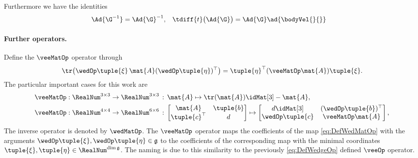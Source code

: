 Furthermore we have the identities
\begin{align}
 \Ad{\G^{-1}} &= \Ad{\G}^{-1},&
 \tdiff{t}\big( \Ad{\G} \big) &= \Ad{\G} \ad{\bodyVel{}{}}
\end{align}


\paragraph{Further operators.}
Define the $\veeMatOp$ operator through
\begin{align}\label{eq:DefWedMatOp}
 \tr\big( \wedOp\tuple{\xi}\, \mat{A} (\wedOp\tuple{\eta})^\top \big) = \tuple{\eta}^\top (\veeMatOp\mat{A}) \tuple{\xi}.
\end{align}
The particular important cases for this work are
\begin{subequations}
\begin{align}
 \veeMatOp &: \RealNum^{3\times 3} \rightarrow \RealNum^{3\times 3} \, : \, \mat{A} \mapsto \tr(\mat{A}) \idMat[3] - \mat{A},
\\
 \veeMatOp &: \RealNum^{4\times 4} \rightarrow \RealNum^{6\times 6} \, : \, \begin{bmatrix} \mat{A} & \tuple{b} \\ \tuple{c}^\top & d \end{bmatrix} \mapsto \begin{bmatrix} d \idMat[3] & (\wedOp \tuple{b})^\top \\ \wedOp\tuple{c} & \veeMatOp\mat{A} \end{bmatrix},
\end{align} 
\end{subequations}
The inverse operator is denoted by $\wedMatOp$.
The $\veeMatOp$ operator maps the coefficients of the map \eqref{eq:DefWedMatOp} with the arguments $\wedOp\tuple{\xi}, \wedOp\tuple{\eta} \in \mathfrak{g}$ to the coefficients of the corresponding map with the minimal coordinates $\tuple{\xi}, \tuple{\eta} \in \RealNum^{\dim\mathfrak{g}}$.
The naming is due to this similarity to the previously \eqref{eq:DefWedgeOp} defined $\veeOp$ operator.

